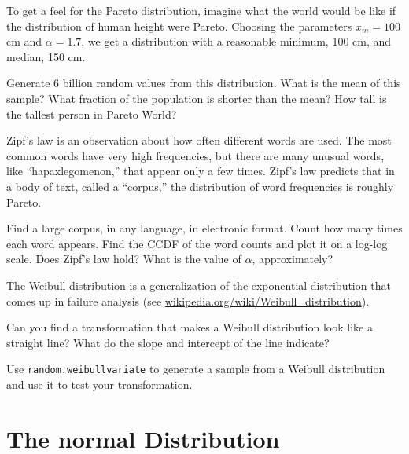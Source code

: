\documentclass[12pt]{book}
\begin{document}
\begin{ex}
To get a feel for the Pareto distribution, imagine what the world
would be like if the distribution of human height were Pareto.
Choosing the parameters $x_m = 100$ cm and $\alpha = 1.7$, we
get a distribution with a reasonable minimum, 100 cm,
and median, 150 cm.

Generate 6 billion random values from this distribution.  What is the
mean of this sample?  What fraction of the population is shorter than
the mean?  How tall is the tallest person in Pareto World?

\end{ex}

\begin{ex}

Zipf's law is an observation about how often different words are used.
The most common words have very high frequencies, but there are many
unusual words, like ``hapaxlegomenon,'' that appear only a few times.
Zipf's law predicts that in a body of text, called a ``corpus,'' the
distribution of word frequencies is roughly Pareto.

Find a large corpus, in any language, in electronic
format.  Count how many times each word appears.  Find the CCDF of the
word counts and plot it on a log-log scale.  Does Zipf's law hold?
What is the value of $\alpha$, approximately?

\end{ex}

\begin{ex}

The Weibull distribution is a generalization of the exponential
distribution that comes up in failure analysis
(see \url{wikipedia.org/wiki/Weibull_distribution}).

Can you find a transformation that makes a Weibull distribution look
like a straight line?  What do the slope and intercept of the
line indicate?

Use {\tt random.weibullvariate} to generate a sample from a
Weibull distribution and use it to test your transformation.

\end{ex}




\section{The normal Distribution}

\newcommand{\erf}{\mathrm{erf}}
\end{document}

